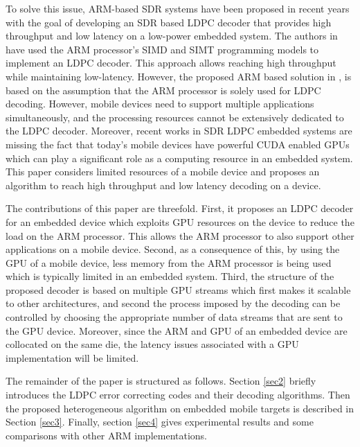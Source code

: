 \documentclass[conference]{IEEEtran}
\begin{document}
To solve this issue, ARM-based SDR systems have been proposed in recent years \cite{art_neon, art_ldpc_cpu0} with the goal of developing an SDR based LDPC decoder that provides high throughput and low latency on a low-power embedded system. The authors in \cite{art_neon} have used the ARM processor's SIMD and SIMT programming models to implement an LDPC decoder. This approach allows reaching high throughput while maintaining low-latency. However, the proposed ARM based solution in \cite{art_neon}, is based on the assumption that the ARM processor is solely used for LDPC decoding. However, mobile devices need to support multiple applications simultaneously, and the processing resources cannot be extensively dedicated to the LDPC decoder. Moreover, recent works in SDR LDPC embedded systems are missing the fact that today's mobile devices have powerful CUDA enabled GPUs which can play a significant role as a computing resource in an embedded system. This paper considers limited resources of a mobile device and proposes an algorithm to reach high throughput and low latency decoding on a device.

The contributions of this paper are threefold. First, it proposes an LDPC decoder for an embedded device which exploits GPU resources on the device to reduce the load on the ARM processor. This allows the ARM processor to also support other applications on a mobile device. Second, as a consequence of this, by using the GPU of a mobile device, less memory from the ARM processor is being used which is typically limited in an embedded system. Third, the structure of the proposed decoder is based on multiple GPU streams which first makes it scalable to other architectures, and second the process imposed by the decoding can be controlled by choosing the appropriate number of data streams that are sent to the GPU device. Moreover, since the ARM and GPU of an embedded device are collocated on the same die, the latency issues associated with a GPU implementation will be limited.

The remainder of the paper is structured as follows. Section \ref{sec2} briefly introduces the LDPC error correcting codes and their decoding algorithms. Then the proposed heterogeneous algorithm on embedded mobile targets is described in Section \ref{sec3}. Finally, section \ref{sec4} gives experimental results and some comparisons with other ARM implementations.
\end{document}
